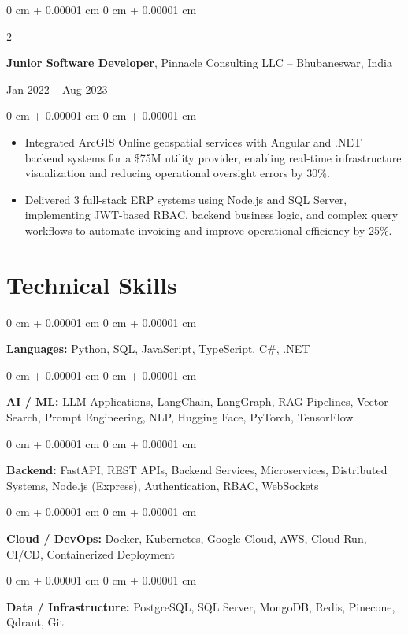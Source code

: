 \documentclass[10pt, letterpaper]{article}
\newenvironment{highlights}{
    \begin{itemize}[
        topsep=0.10 cm,
        parsep=0.10 cm,
        partopsep=0pt,
        itemsep=0pt,
        leftmargin=0 cm + 10pt
    ]
}{
    \end{itemize}
} %
\newenvironment{onecolentry}{
    \begin{adjustwidth}{
        0 cm + 0.00001 cm
    }{
        0 cm + 0.00001 cm
    }
}{
    \end{adjustwidth}
} %
\newenvironment{twocolentry}[2][]{
    \onecolentry
    \def\secondColumn{#2}
    \setcolumnwidth{\fill, 4.5 cm}
    \begin{paracol}{2}
}{
    \switchcolumn \raggedleft \secondColumn
    \end{paracol}
    \endonecolentry
} %
\renewenvironment{highlights}{
    \begin{itemize}[
        topsep=0.05cm,
        parsep=0.10cm,
        partopsep=1pt,
        itemsep=0pt,
        leftmargin=0cm + 10pt
    ]
}{
    \end{itemize}
}
\begin{document}
\begin{twocolentry}{Jan 2022 -- Aug 2023}
\textbf{Junior Software Developer}, Pinnacle Consulting LLC -- Bhubaneswar, India
\end{twocolentry}
\vspace{0.05cm}
\begin{onecolentry}
\begin{highlights}
    \item Integrated ArcGIS Online geospatial services with Angular and .NET backend systems for a \$75M utility provider, enabling real-time infrastructure visualization and reducing operational oversight errors by 30\%.
    \item Delivered 3 full-stack ERP systems using Node.js and SQL Server, implementing JWT-based RBAC, backend business logic, and complex query workflows to automate invoicing and improve operational efficiency by 25\%.
\end{highlights}
\end{onecolentry}

\section{Technical Skills}
\begin{onecolentry}
    \textbf{Languages:} Python, SQL, JavaScript, TypeScript, C\#, .NET
\end{onecolentry}

\vspace{0.1cm}
\begin{onecolentry}
    \textbf{AI / ML:} LLM Applications, LangChain, LangGraph, RAG Pipelines, Vector Search, Prompt Engineering, NLP, Hugging Face, PyTorch, TensorFlow
\end{onecolentry}

\vspace{0.1cm}
\begin{onecolentry}
    \textbf{Backend:} FastAPI, REST APIs, Backend Services, Microservices, Distributed Systems, Node.js (Express), Authentication, RBAC, WebSockets
\end{onecolentry}

\vspace{0.1cm}
\begin{onecolentry}
    \textbf{Cloud / DevOps:} Docker, Kubernetes, Google Cloud, AWS, Cloud Run, CI/CD, Containerized Deployment
\end{onecolentry}

\vspace{0.1cm}
\begin{onecolentry}
    \textbf{Data / Infrastructure:} PostgreSQL, SQL Server, MongoDB, Redis, Pinecone, Qdrant, Git
\end{onecolentry}
\end{document}
